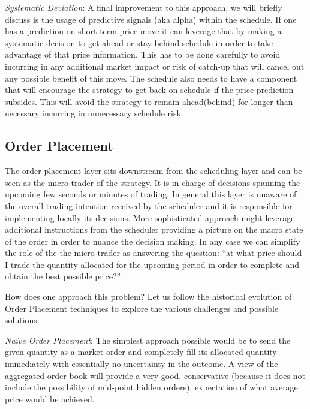 \noindent\emph{Systematic Deviation}: A final improvement to this approach, we will briefly discuss is the usage of predictive signals (aka alpha) within the schedule. If one has a prediction on short term price move it can leverage that by making a systematic decision to get ahead or stay behind schedule in order to take advantage of that price information. This has to be done carefully to avoid incurring in any additional market impact or risk of catch-up that will cancel out any possible benefit of this move. The schedule also needs to have a component that will encourage the strategy to get back on schedule if the price prediction subsides. This will avoid the strategy to remain ahead(behind) for longer than necessary incurring in unnecessary schedule risk.



\subsection{Order Placement}

The order placement layer sits downstream from the scheduling layer and can be seen as the micro trader of the strategy. It is in charge of decisions spanning the upcoming few seconds or minutes of trading. In general this layer is unaware of the overall trading intention received by the scheduler and it is responsible for implementing locally its decisions. More sophisticated approach might leverage  additional instructions from the scheduler providing a picture on the macro state of the order in  order to nuance the decision making. In any case we can simplify the role of the the micro trader as answering the question: ``at what price should I trade the quantity allocated for the upcoming period in order to complete and obtain the best possible price?'' 


How does one approach this problem? Let us follow the historical evolution of Order Placement techniques to explore the various challenges and possible solutions. \twomedskip


\noindent\emph{Na\"ive Order Placement}: The simplest approach possible would be to send the given quantity as a market order and completely fill its allocated quantity immediately with essentially no uncertainty in the outcome. A view of the aggregated order-book will provide a very good, conservative (because it does not include the possibility of mid-point hidden orders), expectation of what average price would be achieved. 


